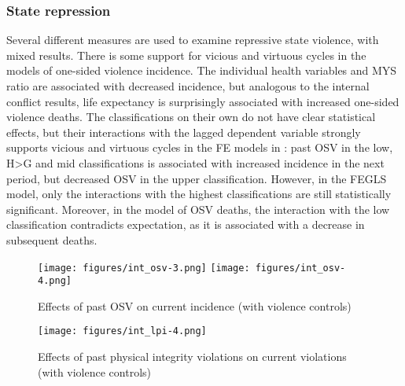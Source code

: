\documentclass[12pt]{article}
\begin{document}
\subsubsection{State repression}

Several different measures are used to examine repressive state violence, with mixed results. There is some support for vicious and virtuous cycles in the models of one-sided violence incidence.
The individual health variables and MYS ratio are associated with decreased incidence, but analogous to the internal conflict results, life expectancy is surprisingly associated with increased one-sided violence deaths.
The classifications on their own do not have clear statistical effects, but their interactions with the lagged dependent variable strongly supports vicious and virtuous cycles in the FE models in : past OSV in the low, H>G and mid classifications is associated with increased incidence in the next period, but decreased OSV in the upper classification.
However, in the FEGLS model, only the interactions with the highest classifications are still statistically significant.
Moreover, in the model of OSV deaths, the interaction with the low classification contradicts expectation, as it is associated with a decrease in subsequent deaths.

\begin{figure}[!htb]
    \centering
    \caption{Effects of past OSV on current incidence (with violence controls)}
    \label{int_osv_class_controls}
    \texttt{[image: figures/int\_osv-3.png]}
    \texttt{[image: figures/int\_osv-4.png]}
\end{figure}

\begin{figure}[htb]
    \centering
    \caption{Effects of past physical integrity violations on current violations (with violence controls)}
    \label{int_lpi_class_controls}
    \texttt{[image: figures/int\_lpi-4.png]}
\end{figure}
\end{document}
